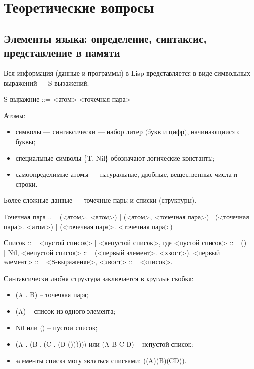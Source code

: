 \chapter{Теоретические вопросы}

\section{Элементы языка: определение, синтаксис, представление в памяти}

Вся информация (данные и программы) в Lisp представляется в виде символьных
выражений --- S-выражений.

\vspace{4mm}
\begin{minipage}{0.92\linewidth}
		S-выражние ::= <атом>|<точечная пара>
\end{minipage}

Атомы:
\begin{itemize}
	\item символы --- синтаксически --- набор литер (букв и цифр), начинающийся
	с буквы;
	\item специальные символы \{T, Nil\} обозначают логические константы;
	\item самоопределимые атомы --- натуральные, дробные, вещественные
	числа и строки.
\end{itemize}

Более сложные данные --- точечные пары и списки (структуры).

Точечная пара ::= (<атом>. <атом>) 
| (<атом>, <точечная пара>)
| (<точечная пара>. <атом>)
| (<точечная пара>. <точечная пара>)

Список ::= <пустой список> | <непустой список>, где \newline
<пустой список> ::= () | Nil,\newline
<непустой список> ::= (<первый элемент>. <хвост>),\newline
<первый элемент> ::= <S-выражение>,\newline
<хвост> ::= <список>.


Синтаксически любая структура заключается в круглые скобки:
\begin{itemize}
	\item (A . B) -- точечная пара;
	\item (A) -- список из одного элемента;
	\item Nil или () -- пустой список;
	\item (A . (B . (C . (D ()))))) или (A B C D) -- непустой список;
	\item элементы списка могу являться списками: ((A)(B)(CD)).
\end{itemize}

